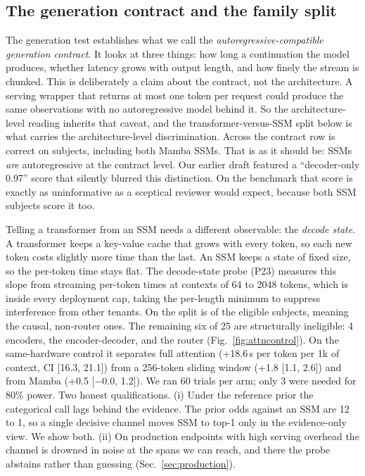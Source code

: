\subsection{The generation contract and the family split}
\label{sec:familysplit}
The generation test establishes what we call the \emph{autoregressive-compatible
generation contract}.  It looks at three things: how long a continuation the model
produces, whether latency grows with output length, and how finely the stream is
chunked.  This is deliberately a claim about the contract, not the architecture.  A
serving wrapper that returns at most one token per request could produce the same
observations with no autoregressive model behind it.  So the architecture-level reading
inherits that caveat, and the transformer-versus-SSM split below is what carries the
architecture-level discrimination.  Across \benchname{} the contract row is correct on
\FamilyPathAcc{} subjects, including both Mamba SSMs.  That is as it should be: SSMs
\emph{are} autoregressive at the contract level.  Our earlier draft featured a
``decoder-only 0.97'' score that silently blurred this distinction.  On the benchmark
that score is exactly as uninformative as a sceptical reviewer would expect, because
both SSM subjects score it too.

Telling a transformer from an SSM needs a different observable: the \emph{decode state}.
A transformer keeps a key-value cache that grows with every token, so each new token
costs slightly more time than the last.  An SSM keeps a state of fixed size, so the
per-token time stays flat.  The decode-state probe (P23) measures this slope from
streaming per-token times at contexts of 64 to 2048 tokens, which is inside every
deployment cap, taking the per-length minimum to suppress interference from other
tenants.  On \benchname{} the split is \SsmSplitAcc{} of the \SsmEligible{} eligible
subjects, meaning the causal, non-router ones.  The remaining six of 25 are structurally
ineligible: 4 encoders, the encoder-decoder, and the router (Fig.~\ref{fig:attncontrol}).
On the same-hardware control it separates full attention (+18.6\,\textmu s per token
per 1k of context, CI [16.3, 21.1]) from a 256-token sliding window (+1.8 [1.1, 2.6])
and from Mamba (+0.5 [$-0.0$, 1.2]).  We ran 60 trials per arm; only 3 were needed for
80\% power.  Two honest qualifications.  (i) Under the reference prior the categorical
call lags behind the evidence.  The prior odds against an SSM are 12 to 1, so a single
decisive channel moves SSM to top-1 only in the evidence-only view.  We show both.
(ii) On production endpoints with high serving overhead the channel is drowned in noise
at the spans we can reach, and there the probe abstains rather than guessing
(Sec.~\ref{sec:production}).


